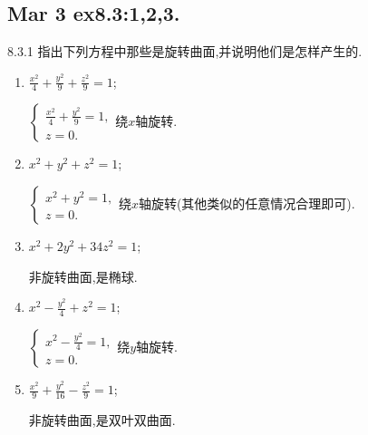 \setcounter{chapter}{1} %
\chapter{}

\section{Mar 3 ex8.3:1,2,3.}

\begin{exercise}{8.3.1}
    指出下列方程中那些是旋转曲面,并说明他们是怎样产生的.
        \begin{enumerate}
            \item $\frac{x^2}{4}+\frac{y^2}{9}+\frac{z^2}{9}=1$;
        \begin{solution}
        $\begin{cases}
            \frac{x^2}{4}+\frac{y^2}{9}=1,\\
            z=0.
        \end{cases}$绕$x$轴旋转.
        \end{solution}

            \item $x^2+y^2+z^2=1$;
        \begin{solution}
        $\begin{cases}
            x^2+y^2=1,\\
            z=0.
        \end{cases}$绕$x$轴旋转(其他类似的任意情况合理即可).
        \end{solution}

            \item $x^2+2y^2+34z^2=1$;
        \begin{solution}
        非旋转曲面,是椭球.
        \end{solution}
        
            \item $x^2-\frac{y^2}{4}+z^2=1$;
        \begin{solution}
        $\begin{cases}
            x^2-\frac{y^2}{4}=1,\\
            z=0.
        \end{cases}$绕$y$轴旋转.
        \end{solution}

            \item $\frac{x^2}{9}+\frac{y^2}{16}-\frac{z^2}{9}=1$;
        \begin{solution}
            非旋转曲面,是双叶双曲面.
        \end{solution}          


\end{enumerate}
\end{exercise}
